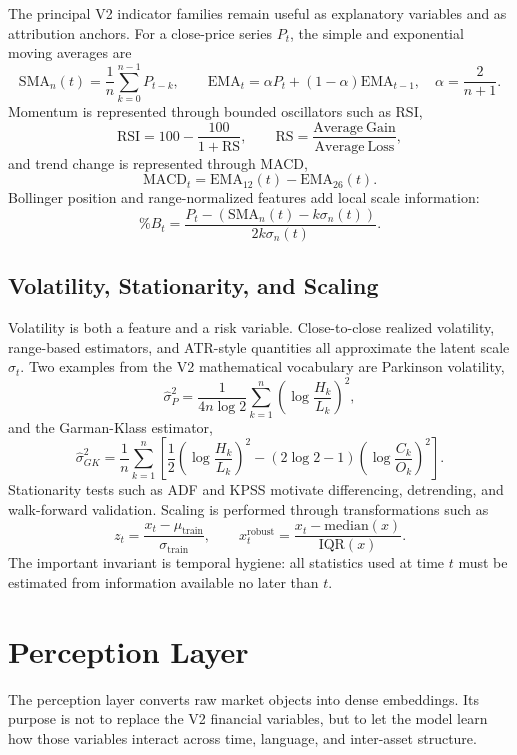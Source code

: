 \documentclass[10pt]{article}
\begin{document}
The principal V2 indicator families remain useful as explanatory variables and as
attribution anchors. For a close-price series \(P_t\), the simple and exponential moving
averages are
\[
	\mathrm{SMA}_n(t)=\frac{1}{n}\sum_{k=0}^{n-1}P_{t-k},\qquad
	\mathrm{EMA}_t=\alpha P_t+(1-\alpha)\mathrm{EMA}_{t-1},
	\quad \alpha=\frac{2}{n+1}.
\]
Momentum is represented through bounded oscillators such as RSI,
\[
	\mathrm{RSI}=100-\frac{100}{1+\mathrm{RS}},\qquad
	\mathrm{RS}=\frac{\mathrm{Average\ Gain}}{\mathrm{Average\ Loss}},
\]
and trend change is represented through MACD,
\[
	\mathrm{MACD}_t=\mathrm{EMA}_{12}(t)-\mathrm{EMA}_{26}(t).
\]
Bollinger position and range-normalized features add local scale information:
\[
	\%B_t=\frac{P_t-\left(\mathrm{SMA}_n(t)-k\sigma_n(t)\right)}
	{2k\sigma_n(t)}.
\]

\subsection{Volatility, Stationarity, and Scaling}

Volatility is both a feature and a risk variable. Close-to-close realized volatility,
range-based estimators, and ATR-style quantities all approximate the latent scale
\(\sigma_t\). Two examples from the V2 mathematical vocabulary are Parkinson volatility,
\[
	\widehat{\sigma}_{P}^{2}
	=
	\frac{1}{4n\log 2}\sum_{k=1}^{n}
	\left(\log\frac{H_k}{L_k}\right)^2,
\]
and the Garman-Klass estimator,
\[
	\widehat{\sigma}_{GK}^{2}
	=
	\frac{1}{n}\sum_{k=1}^{n}
	\left[
		\frac{1}{2}\left(\log\frac{H_k}{L_k}\right)^2
		-
		(2\log 2-1)\left(\log\frac{C_k}{O_k}\right)^2
		\right].
\]
Stationarity tests such as ADF and KPSS motivate differencing, detrending, and walk-forward
validation. Scaling is performed through transformations such as
\[
	z_t=\frac{x_t-\mu_{\mathrm{train}}}{\sigma_{\mathrm{train}}},
	\qquad
	x_t^{\mathrm{robust}}=\frac{x_t-\mathrm{median}(x)}
	{\mathrm{IQR}(x)}.
\]
The important invariant is temporal hygiene: all statistics used at time \(t\) must be
estimated from information available no later than \(t\).

\section{Perception Layer}

The perception layer converts raw market objects into dense embeddings. Its purpose is not to
replace the V2 financial variables, but to let the model learn how those variables interact
across time, language, and inter-asset structure.
\end{document}
